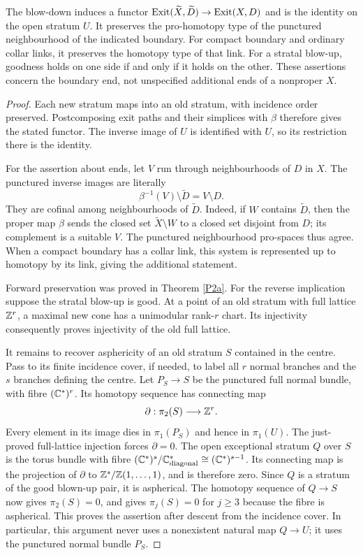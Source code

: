 \begin{theorem}\label{P2b}
The blow-down induces a functor
$\operatorname{Exit}(\widetilde X,\widetilde D)\to\operatorname{Exit}(X,D)$ and is the identity
on the open stratum $U$. It preserves the pro-homotopy type of the
punctured neighbourhood of the indicated boundary. For compact
boundary and ordinary collar links, it preserves the homotopy type
of that link. For a stratal blow-up, goodness holds on one side if
and only if it holds on the other. These assertions concern the
boundary end, not unspecified additional ends of a nonproper $X$.
\end{theorem}
\begin{proof}
Each new stratum maps into an old stratum, with incidence order
preserved. Postcomposing exit paths and their simplices with
$\beta$ therefore gives the stated functor. The inverse image of
$U$ is identified with $U$, so its restriction there is the identity.

For the assertion about ends, let $V$ run through neighbourhoods
of $D$ in $X$. The punctured inverse images are literally
\[
 \beta^{-1}(V)\setminus\widetilde D=V\setminus D.
\]
They are cofinal among neighbourhoods of $\widetilde D$. Indeed,
if $W$ contains $\widetilde D$, then the proper map $\beta$ sends
the closed set $\widetilde X\setminus W$ to a closed set disjoint
from $D$; its complement is a suitable $V$. The punctured
neighbourhood pro-spaces thus agree. When a compact boundary has
a collar link, this system is represented up to homotopy by its
link, giving the additional statement.

Forward preservation was proved in Theorem \ref{P2a}. For the
reverse implication suppose the stratal blow-up is good. At a
point of an old stratum with full lattice $\mathbb Z^r$, a maximal new
cone has a unimodular rank-$r$ chart. Its injectivity consequently
proves injectivity of the old full lattice.

It remains to recover asphericity of an old stratum $S$ contained
in the centre. Pass to its finite incidence cover, if needed, to
label all $r$ normal branches and the $s$ branches defining the
centre. Let $P_S\to S$ be the punctured full normal bundle, with
fibre $(\mathbb C^*)^r$. Its homotopy sequence has connecting map
\[
 \partial:\pi _2(S)\longrightarrow\mathbb Z^r.
\]
Every element in its image dies in $\pi _1(P_S)$ and hence in
$\pi _1(U)$. The just-proved full-lattice injection forces
$\partial=0$. The open exceptional stratum $Q$ over $S$ is the
torus bundle with fibre
$(\mathbb C^*)^s/\mathbb C^*_{\rm diagonal}\cong(\mathbb C^*)^{s-1}$.
Its connecting map is the projection of $\partial$ to
$\mathbb Z^s/\mathbb Z(1,\ldots,1)$, and is therefore zero. Since $Q$ is a
stratum of the good blown-up pair, it is aspherical. The homotopy
sequence of $Q\to S$ now gives $\pi _2(S)=0$, and gives
$\pi_j(S)=0$ for $j\geq3$ because the fibre is aspherical.
This proves the assertion after descent from the incidence cover.
In particular, this argument never uses a nonexistent natural
map $Q\to U$; it uses the punctured normal bundle $P_S$.
\end{proof}

